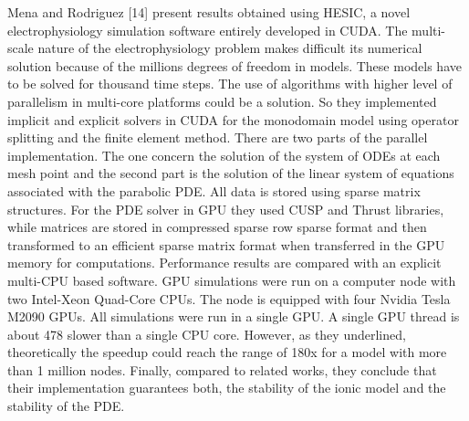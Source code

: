 Mena and Rodriguez [14] present results obtained using HESIC, a novel electrophysiology simulation software entirely developed in CUDA. The multi-scale nature of the electrophysiology problem makes difficult its numerical solution because of the millions degrees of freedom in models. These models have to be solved for thousand time steps. The use of algorithms with higher level of parallelism in multi-core platforms could be a solution. So they implemented implicit and explicit solvers in CUDA for the monodomain model using operator splitting and the finite element method. There are two parts of the parallel implementation. The one concern the solution of the system of ODEs at each mesh point and the second part is the solution of the linear system of equations associated with the parabolic PDE. All data is stored using sparse matrix structures. For the PDE solver in GPU they used CUSP and Thrust libraries, while matrices are stored in compressed sparse row sparse format and then transformed to an efficient sparse matrix format when transferred in the GPU memory for computations. Performance results are compared with an explicit multi-CPU based software. GPU simulations were run on a computer node with two Intel-Xeon Quad-Core CPUs. The node is equipped with four Nvidia Tesla M2090 GPUs. All simulations were run in a single GPU. A single GPU thread is about 478 slower than a single CPU core. However, as they underlined, theoretically the speedup could reach the range of 180x for a model with more than 1 million nodes. Finally, compared to related works, they conclude that their implementation guarantees both, the stability of the ionic model and the stability of the PDE.


